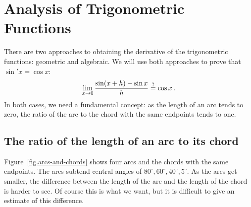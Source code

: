 
\chapter{Analysis of Trigonometric Functions}\label{ch.analysis}

There are two approaches to obtaining the derivative of the trigonometric functions: geometric and algebraic. We will use both approaches to prove that $\sin' x=\cos x$:
\[
\lim_{x \rightarrow 0} \displaystyle\frac{\sin (x+h)-\sin x}{h}\stackrel{?}{=}\cos x\,.
\]
In both cases, we need a fundamental concept: as the length of an arc tends to zero, the ratio of the arc to the chord with the same endpoints tends to one.

\section{The ratio of the length of an arc to its chord}

Figure~\ref{fig.arcs-and-chords} shows four arcs and the chords with the same endpoints. The arcs subtend central angles of $80^\circ, 60^\circ, 40^\circ, 5^\circ$. As the arcs get smaller, the difference between the length of the arc and the length of the chord is harder to see. Of course this is what we want, but it is difficult to give an estimate of this difference.

